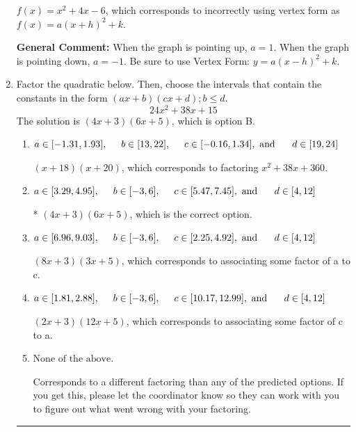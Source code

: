 \documentclass{extbook}[14pt]
\newcommand{\litem}[1]{\item #1

\rule{\textwidth}{0.4pt}}
\begin{document}
\begin{enumerate}
{\begin{enumerate}[label=\Alph*.]
$f(x)=x^{2} +4 x -6$, which corresponds to incorrectly using vertex form as $f(x) = a(x+h)^2+k$.
\end{enumerate}

\textbf{General Comment:} When the graph is pointing up, $a=1$. When the graph is pointing down, $a=-1$. Be sure to use Vertex Form: $y = a(x-h)^2+k$.
}
\litem{
Factor the quadratic below. Then, choose the intervals that contain the constants in the form $(ax+b)(cx+d); b \leq d.$
\[ 24x^{2} +38 x + 15 \]The solution is \( (4x + 3)(6x + 5) \), which is option B.\begin{enumerate}[label=\Alph*.]
\item \( a \in [-1.31, 1.93], \hspace*{5mm} b \in [13, 22], \hspace*{5mm} c \in [-0.16, 1.34], \text{ and } \hspace*{5mm} d \in [19, 24] \)

 $(x + 18)(x + 20)$, which corresponds to factoring $x^{2} +38 x + 360$.
\item \( a \in [3.29, 4.95], \hspace*{5mm} b \in [-3, 6], \hspace*{5mm} c \in [5.47, 7.45], \text{ and } \hspace*{5mm} d \in [4, 12] \)

* $(4x + 3)(6x + 5)$, which is the correct option.
\item \( a \in [6.96, 9.03], \hspace*{5mm} b \in [-3, 6], \hspace*{5mm} c \in [2.25, 4.92], \text{ and } \hspace*{5mm} d \in [4, 12] \)

 $(8x + 3)(3x + 5)$, which corresponds to associating some factor of a to c.
\item \( a \in [1.81, 2.88], \hspace*{5mm} b \in [-3, 6], \hspace*{5mm} c \in [10.17, 12.99], \text{ and } \hspace*{5mm} d \in [4, 12] \)

 $(2x + 3)(12x + 5)$, which corresponds to associating some factor of c to a.
\item \( \text{None of the above.} \)

 Corresponds to a different factoring than any of the predicted options. If you get this, please let the coordinator know so they can work with you to figure out what went wrong with your factoring.
\end{enumerate}

}
\end{enumerate}
\end{document}
